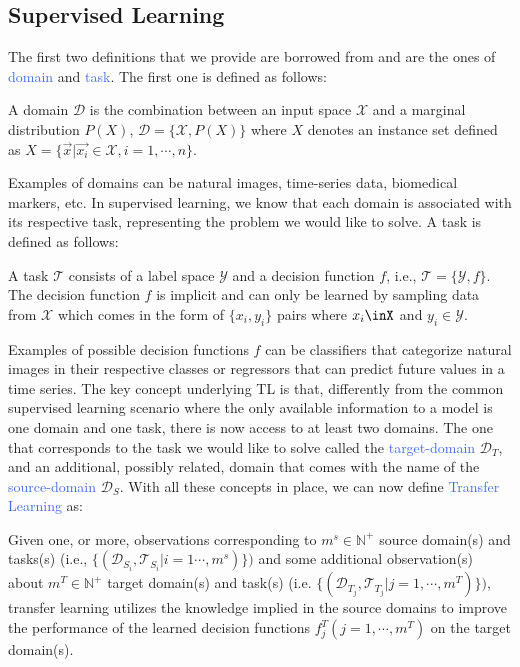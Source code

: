 \subsection{Supervised Learning}
The first two definitions that we provide are borrowed from \citet{zhuang2020comprehensive} and are the ones of \textcolor{RoyalBlue}{domain} and \textcolor{RoyalBlue}{task}. The first one is defined as follows:
\begin{definition}
	A domain $\mathcal{D}$ is the combination between an input space $\mathcal{X}$ and a marginal distribution $P(X)$, $\mathcal{D} = \{\mathcal{X},P(X)\}$ where $X$ denotes an instance set defined as $X=\{\vec{x}|\vec{x_i}\in \mathcal{X}, i =1, \cdots, n \}$.
\end{definition}
Examples of domains can be natural images, time-series data, biomedical markers, etc. In supervised learning, we know that each domain is associated with its respective task, representing the problem we would like to solve. A task is defined as follows:
\begin{definition}
	A task $\mathcal{T}$ consists of a label space $\mathcal{Y}$ and a decision function $f$, i.e., $\mathcal{T}=\{\mathcal{Y},f\}$. The decision function $f$ is implicit and can only be learned by sampling data from $\mathcal{X}$ which comes in the form of $\{x_i,y_i\}$ pairs where $x_i\inX$ and $y_i \in \mathcal{Y}$.
\end{definition}
Examples of possible decision functions $f$ can be classifiers that categorize natural images in their respective classes or regressors that can predict future values in a time series. 
The key concept underlying TL is that, differently from the common supervised learning scenario
where the only available information to a model is one domain and one task, there is now access to at least two domains. The one that corresponds to the task we would like to solve called the \textcolor{RoyalBlue}{target-domain} $\mathcal{D}_T$, and an additional, possibly related, domain that comes with the name of the \textcolor{RoyalBlue}{source-domain} $\mathcal{D}_S$. With all these concepts in place, we can now define \textcolor{RoyalBlue}{Transfer Learning} as:
\begin{definition}
Given one, or more, observations corresponding to $m^s \in \mathds{N}^{+}$ source domain(s) and tasks(s) (i.e., $\{(\mathcal{D}_{S}_{i}, \mathcal{T}_{S}_{i}|i=1\cdots,m^s)\})$ and some additional observation(s) about $m^T \in \mathds{N}^{+}$ target domain(s) and task(s) (i.e. $\{(\mathcal{D}_{T}_{j},\mathcal{T}_{T}_{j}|j=1,\cdots,m^T)\})$, transfer learning utilizes the knowledge implied in the source domains to improve the performance of the learned decision functions $f^{T}_j(j=1,\cdots,m^T)$ on the target domain(s).
\end{definition}
